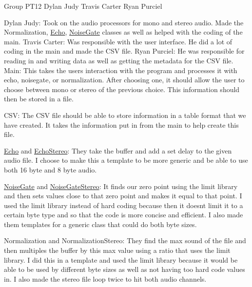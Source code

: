 Group P\+T12 Dylan Judy Travis Carter Ryan Purciel

Dylan Judy\+: Took on the audio processors for mono and stereo audio. Made the Normalization, \hyperlink{classEcho}{Echo}, \hyperlink{classNoiseGate}{Noise\+Gate} classes as well as helped with the coding of the main. Travis Carter\+: Was responsible with the user interface. He did a lot of coding in the main and made the C\+SV file. Ryan Purciel\+: He was responsible for reading in and writing data as well as getting the metadata for the C\+SV file.   Main\+: This takes the user\textquotesingle{}s interaction with the program and processes it with echo, noisegate, or normalization. After choosing one, it should allow the user to choose between mono or stereo of the previous choice. This information should then be stored in a file.

C\+SV\+: The C\+SV file should be able to store information in a table format that we have created. It takes the information put in from the main to help create this file.

\hyperlink{classEcho}{Echo} and \hyperlink{classEchoStereo}{Echo\+Stereo}\+: They take the buffer and add a set delay to the given audio file. I choose to make this a template to be more generic and be able to use both 16 byte and 8 byte audio.

\hyperlink{classNoiseGate}{Noise\+Gate} and \hyperlink{classNoiseGateStereo}{Noise\+Gate\+Stereo}\+: It finds our zero point using the limit library and then sets values close to that zero point and makes it equal to that point. I used the limit library instead of hard coding because then it doesn\textquotesingle{}t limit it to a certain byte type and so that the code is more concise and efficient. I also made them templates for a generic class that could do both byte sizes.

Normalization and Normalization\+Stereo\+: They find the max sound of the file and then multiples the buffer by this max value using a ratio that uses the limit library. I did this in a template and used the limit library because it would be able to be used by different byte sizes as well as not having too hard code values in. I also made the stereo file loop twice to hit both audio channels. 